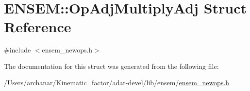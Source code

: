 \hypertarget{structENSEM_1_1OpAdjMultiplyAdj}{}\section{E\+N\+S\+EM\+:\+:Op\+Adj\+Multiply\+Adj Struct Reference}
\label{structENSEM_1_1OpAdjMultiplyAdj}


{\ttfamily \#include $<$ensem\+\_\+newops.\+h$>$}



The documentation for this struct was generated from the following file\+:\begin{DoxyCompactItemize}
\item 
/\+Users/archanar/\+Kinematic\+\_\+factor/adat-\/devel/lib/ensem/\mbox{\hyperlink{adat-devel_2lib_2ensem_2ensem__newops_8h}{ensem\+\_\+newops.\+h}}\end{DoxyCompactItemize}

